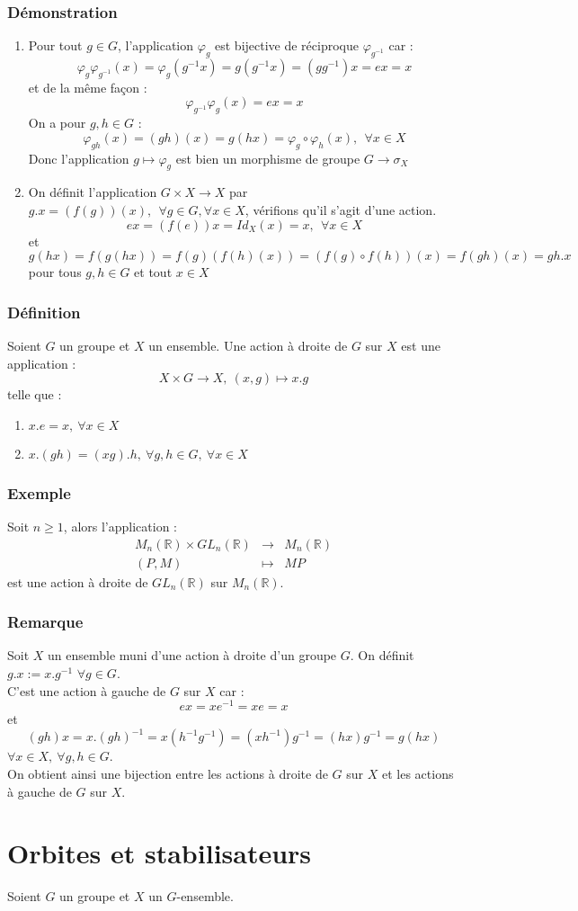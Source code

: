 \documentclass[a4paper, oneside]{report}
\newcommand{\x}{\times}
\newcommand{\R}{\mathbb{R}}
\newcommand{\defi}{\subsubsection{Définition}}
\newcommand{\dem}{\subsubsection{Démonstration}}
\newcommand{\remar}{\subsubsection{Remarque}}
\newcommand{\exem}{\subsubsection{Exemple}}
\begin{document}
\dem
\begin{enumerate}
\item Pour tout $g\in G$, l'application $\varphi_g$ est bijective de réciproque $\varphi_{g^{-1}}$ car :
$$\varphi_g\varphi_{g^{-1}}(x)=\varphi_g(g^{-1}x)=g(g^{-1}x)=(gg^{-1})x=ex=x$$
et de la même façon :
$$\varphi_{g^{-1}}\varphi_g(x)=ex=x$$
On a pour $g,h\in G$ :
$$\varphi_{gh}(x)=(gh)(x)=g(hx)=\varphi_g\circ \varphi_h(x),~~\forall x\in X$$
Donc l'application $g\mapsto \varphi_g$ est bien un morphisme de groupe $G\rightarrow \sigma_X$
\item On définit l'application $G\x X \rightarrow X$ par $g.x = (f(g))(x),~~\forall g\in G,\forall x\in X$, vérifions qu'il s'agit d'une action.\\
$$ex=(f(e))x=Id_X(x)=x,~~\forall x\in X$$
et 
$$g(hx)=f(g(hx))=f(g)(f(h)(x))=(f(g)\circ f(h) )(x)=f(gh)(x)=gh.x$$
pour tous $g,h\in G$ et tout $x\in X$
\end{enumerate}

\defi
Soient $G$ un groupe et $X$ un ensemble. Une action à droite de $G$ sur $X$ est une application :
$$X\x G\rightarrow X,~(x,g)\mapsto x.g$$
telle que :
\begin{enumerate}
\item $x.e=x,~\forall x\in X$
\item $x.(gh)=(xg).h,~\forall g,h\in G,~\forall x\in X$
\end{enumerate}

\exem
Soit $n\geq 1$, alors l'application :
$$\begin{array}{lll}
M_n(\R)\x GL_n(\R)&\rightarrow & M_n(\R)\\
(P,M)&\mapsto & MP
\end{array}$$
est une action à droite de $GL_n(\R)$ sur $M_n(\R)$.

\remar
Soit $X$ un ensemble muni d'une action à droite d'un groupe $G$. On définit $g.x := x.g^{-1}$ $\forall g\in G$.\\
C'est une action à gauche de $G$ sur $X$ car :
$$ex=xe^{-1}=xe=x$$
et 
$$(gh)x=x.(gh)^{-1}=x(h^{-1}g^{-1})=(xh^{-1})g^{-1}=(hx)g^{-1}=g(hx)$$
$\forall x\in X, ~\forall g,h\in G$.\\
On obtient ainsi une bijection entre les actions à droite de $G$ sur $X$ et les actions à gauche de $G$ sur $X$.

\section{Orbites et stabilisateurs}
Soient $G$ un groupe et $X$ un $G$-ensemble.\\
\end{document}
